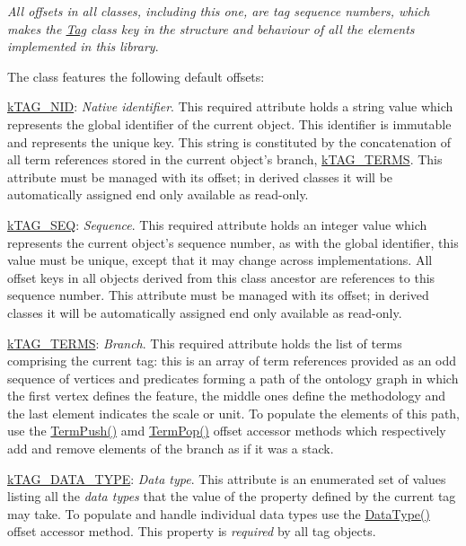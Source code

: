 {\itshape All offsets in all classes, including this one, are tag sequence numbers, which makes the \hyperlink{class_ontology_wrapper_1_1_tag}{Tag} class key in the structure and behaviour of all the elements implemented in this library}.

The class features the following default offsets\-:


\begin{DoxyItemize}
\item {\ttfamily \hyperlink{}{k\-T\-A\-G\-\_\-\-N\-I\-D}}\-: {\itshape Native identifier}. This required attribute holds a string value which represents the global identifier of the current object. This identifier is immutable and represents the unique key. This string is constituted by the concatenation of all term references stored in the current object's branch, \hyperlink{}{k\-T\-A\-G\-\_\-\-T\-E\-R\-M\-S}. This attribute must be managed with its offset; in derived classes it will be automatically assigned end only available as read-\/only. 
\item {\ttfamily \hyperlink{}{k\-T\-A\-G\-\_\-\-S\-E\-Q}}\-: {\itshape Sequence}. This required attribute holds an integer value which represents the current object's sequence number, as with the global identifier, this value must be unique, except that it may change across implementations. All offset keys in all objects derived from this class ancestor are references to this sequence number. This attribute must be managed with its offset; in derived classes it will be automatically assigned end only available as read-\/only. 
\item {\ttfamily \hyperlink{}{k\-T\-A\-G\-\_\-\-T\-E\-R\-M\-S}}\-: {\itshape Branch}. This required attribute holds the list of terms comprising the current tag\-: this is an array of term references provided as an odd sequence of vertices and predicates forming a path of the ontology graph in which the first vertex defines the feature, the middle ones define the methodology and the last element indicates the scale or unit. To populate the elements of this path, use the \hyperlink{class_ontology_wrapper_1_1_tag_object_af1f5bda567cfd03e3098faf68b34ff1b}{Term\-Push()} amd \hyperlink{class_ontology_wrapper_1_1_tag_object_adb3d32d6ac4285202f4b2e725e04b946}{Term\-Pop()} offset accessor methods which respectively add and remove elements of the branch as if it was a stack. 
\item {\ttfamily \hyperlink{}{k\-T\-A\-G\-\_\-\-D\-A\-T\-A\-\_\-\-T\-Y\-P\-E}}\-: {\itshape Data type}. This attribute is an enumerated set of values listing all the {\itshape data types} that the value of the property defined by the current tag may take. To populate and handle individual data types use the \hyperlink{class_ontology_wrapper_1_1_tag_object_aafaa4544bcec86e5d788ef360128d7fb}{Data\-Type()} offset accessor method. This property is {\itshape required} by all tag objects. 

\end{DoxyItemize}
